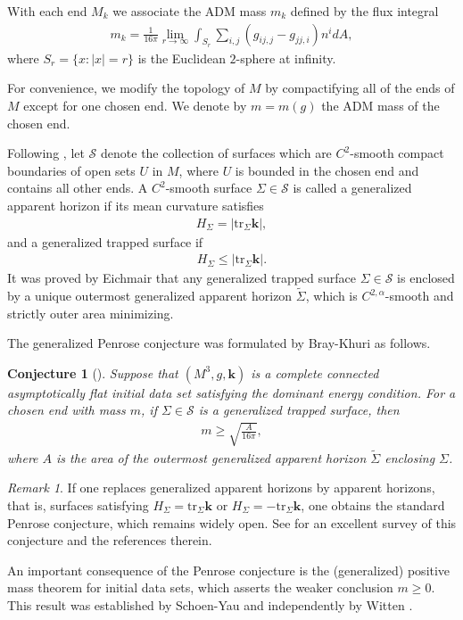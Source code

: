\documentclass[11pt, letterpaper]{amsart}
\newtheorem{conj}[thm]{Conjecture}
\theoremstyle{definition}
\theoremstyle{remark}
\newtheorem{rmk}{Remark}[section]
\begin{document}
With each end $M_k$ we associate the ADM mass $m_k$ defined by the flux integral
\begin{align*}
	m_k = \frac{1}{16 \pi } \lim_{r\to \infty}   \int_{S_r} \sum_{i,j}^{}\left( g_{ij,j} - g_{jj,i} \right) n ^{i} dA,
\end{align*} 
where $S_r= \{x: |x|=r\} $ is the Euclidean $2$-sphere at infinity. 

For convenience, we modify the topology of $M$ by compactifying all of the ends of $M$ except for one chosen end. We denote by $m= m(g)$ the ADM mass of the chosen end.

Following \cite{BrayKhuri11}, let $\mathcal{S}$ denote the collection of surfaces which are $C^2$-smooth compact boundaries of open sets $U$ in $M$, where $U$ is bounded in the chosen end and contains all other ends. A $C^{2}$-smooth surface $\Sigma \in \mathcal{S}$ is called a generalized apparent horizon if its mean curvature satisfies
\begin{align*}
	H_{\Sigma } = |\mathrm{tr}_{\Sigma }\mathbf{k}|,
\end{align*} 
and a generalized trapped surface if
\begin{align*}
	H_{\Sigma } \leq |\mathrm{tr}_{\Sigma }\mathbf{k}|.
\end{align*} 
It was proved by Eichmair \cite{Eichmair10} that any generalized trapped surface $\Sigma \in \mathcal{S}$ is enclosed by a unique outermost generalized apparent horizon $\tilde{\Sigma }$, which is $C^{2,\alpha }$-smooth and strictly outer area minimizing.  

The generalized Penrose conjecture was formulated by Bray-Khuri as follows.
\begin{conj}[{\cite[Conjecture 4]{BrayKhuri11}}]
	Suppose that $(M^3, g, \mathbf{k})$ is a complete connected asymptotically flat initial data set satisfying the dominant energy condition. For a chosen end with mass $m$, if $\Sigma \in \mathcal{S}$ is a generalized trapped surface, then
	\begin{align}
		m \geq \sqrt{\frac{A}{16 \pi }} ,
	\end{align}
	where $A$ is the area of the outermost generalized apparent horizon $\tilde{\Sigma }$ enclosing $\Sigma $. 
\end{conj}

\begin{rmk}
	If one replaces generalized apparent horizons by apparent horizons, that is, surfaces satisfying $H_{\Sigma }= \mathrm{tr}_{\Sigma }\mathbf{k}$ or $H_{\Sigma }= - \mathrm{tr}_{\Sigma } \mathbf{k}$, one obtains the standard Penrose conjecture, which remains widely open. See \cite{Mars09} for an excellent survey of this conjecture and the references therein.  

An important consequence of the Penrose conjecture is the (generalized) positive mass theorem for initial data sets, which asserts the weaker conclusion $m \geq 0$. This result was established by Schoen-Yau \cite{SchoenYau81} and independently by Witten \cite{Witten81}.

\end{rmk}
\end{document}
